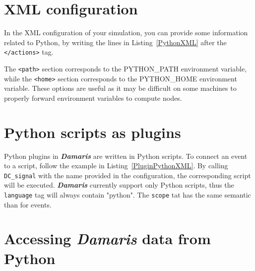 \documentclass[11pt]{report}
\newcommand{\Damaris}{\emph{\textbf{Damaris}}}
\newcommand{\function}[1]{\texttt{#1}}
\begin{document}
\section{XML configuration}

In the XML configuration of your simulation, you can provide some information related to
Python, by writing the lines in Listing~\ref{PythonXML} after the \texttt{</actions>} tag.

\noindent\begin{minipage}{\textwidth}
\vspace{0.5cm}

\end{minipage}

The \texttt{<path>} section corresponds to the PYTHON\_PATH environment variable,
while the \texttt{<home>} section corresponds to the PYTHON\_HOME environment variable.
These options are useful as it may be difficult on some machines to properly forward environment
variables to compute nodes.

\section{Python scripts as plugins}

Python plugins in \Damaris{} are written in Python scripts. To connect an event to
a script, follow the example in Listing~\ref{PluginPythonXML}. By calling \function{DC\_signal}
with the name provided in the configuration, the corresponding script will be executed.
\Damaris{} currently support only Python scripts, thus the \texttt{language} tag will always contain
"python". The \texttt{scope} tat has the same semantic than for events.

\noindent\begin{minipage}{\textwidth}
\vspace{0.5cm}

\end{minipage}

\section{Accessing \Damaris{} data from Python}
\end{document}
